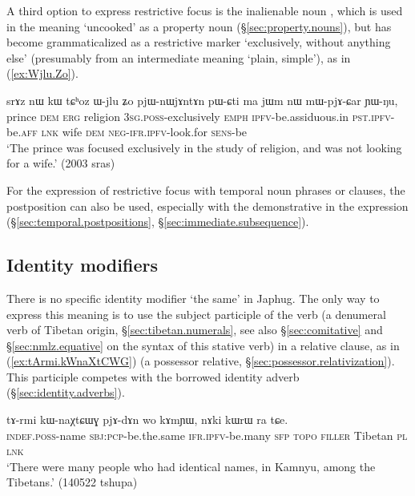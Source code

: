 A third option to express restrictive focus is the inalienable noun , which is used in the meaning `uncooked' as a property noun (§\ref{sec:property.nouns}), but has become grammaticalized as a restrictive marker `exclusively, without anything else' (presumably from an intermediate meaning `plain, simple'), as in (\ref{ex:Wjlu.Zo}).

\begin{exe}
\ex \label{ex:Wjlu.Zo}
 \gll srɤz nɯ kɯ tɕʰoz ɯ-jlu ʑo pjɯ-nɯjɤntɤn pɯ-ɕti ma jɯm nɯ mɯ-pjɤ-ɕar ɲɯ-ŋu, \\
prince \textsc{dem} \textsc{erg}  religion \textsc{3sg}.\textsc{poss}-exclusively \textsc{emph} \textsc{ipfv}-be.assiduous.in  \textsc{pst}.\textsc{ipfv}-be.\textsc{aff} \textsc{lnk} wife \textsc{dem} \textsc{neg}-\textsc{ifr}.\textsc{ipfv}-look.for \textsc{sens}-be \\
 \glt `The prince was focused exclusively in the study of religion, and was not looking for a wife.' (2003 sras)
 \end{exe}

For the expression of restrictive focus with temporal noun phrases or clauses, the postposition  can also be used, especially with the demonstrative in the expression  (§\ref{sec:temporal.postpositions}, §\ref{sec:immediate.subsequence}).



\subsection{Identity modifiers} \label{sec:identity.modifier}
There is no specific identity modifier `the same' in Japhug. The only way to express this meaning is to use the subject participle of the verb  (a denumeral verb of Tibetan origin, §\ref{sec:tibetan.numerals}, see also §\ref{sec:comitative} and §\ref{sec:nmlz.equative} on the syntax of this stative verb) in a relative clause, as in (\ref{ex:tArmi.kWnaXtCWG}) (a possessor relative, §\ref{sec:possessor.relativization}). This participle competes with the borrowed identity adverb  (§\ref{sec:identity.adverbs}).

\begin{exe}
\ex \label{ex:tArmi.kWnaXtCWG}
\gll tɤ-rmi kɯ-naχtɕɯɣ pjɤ-dɤn wo kɤmɲɯ, nɤki kɯrɯ ra tɕe. \\
\textsc{indef}.\textsc{poss}-name \textsc{sbj}:\textsc{pcp}-be.the.same \textsc{ifr}.\textsc{ipfv}-be.many \textsc{sfp}  \textsc{topo} \textsc{filler} Tibetan \textsc{pl} \textsc{lnk} \\
\glt `There were many people who had identical names, in Kamnyu, among the Tibetans.' (140522 tshupa) 	
\end{exe}


